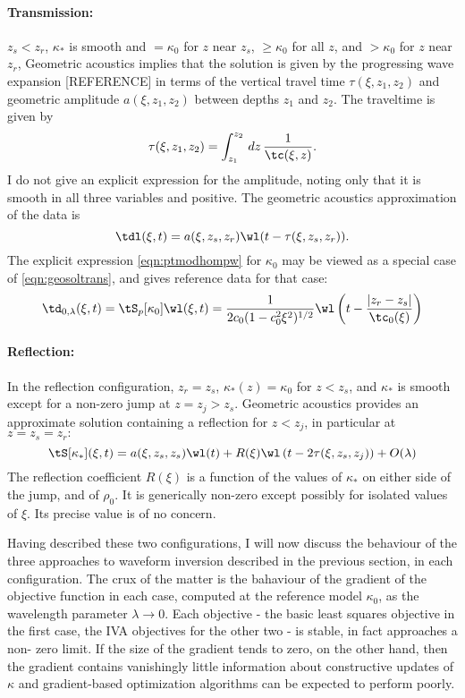 \paragraph{Transmission:} $z_s < z_r$, $\kappa_*$ is smooth and $ = \kappa_0$ for
$z$ near $z_s$, $\ge \kappa_0$ for all $z$, and $>\kappa_0$ for $z$
near $z_r$, Geometric acoustics implies that the solution is given by
the progressing wave expansion [REFERENCE] in terms of the vertical
travel time $\tau(\xi,z_1,z_2)$ and geometric amplitude
$a(\xi,z_1,z_2)$ between depths $z_1$ and $z_2$. The traveltime is given by
\[
\tau(\xi,z_1,z_2) = \int_{z_1}^{z_2}\,dz\, \frac{1}{\tc(\xi,z)}.
\]
I do not give an explicit expression for the amplitude, noting only
that it is smooth in all three variables and positive. The geometric
acoustics approximation of the data is
\begin{equation}
  \label{eqn:geosoltrans}
  \tdl(\xi,t) = a(\xi,z_s,z_r)\wl(t-\tau(\xi,z_s,z_r)).
\end{equation}
The explicit expression \ref{eqn:ptmodhompw} for $\kappa_0$ may be
viewed as a special case of \ref{eqn:geosoltrans}, and gives reference
data for that case:
\begin{equation}
  \label{eqn:analsoltrans}
  \td_{0,\lambda}(\xi,t) =  \tS_p[\kappa_0]\wl(\xi,t)  = \frac{1}{2c_0(1-c_0^2\xi^2)^{1/2}}\wl
                                \left(t-\frac{|z_r-z_s|}{\tc_0(\xi)}\right)
\end{equation}

\paragraph{Reflection:}
In the reflection configuration, $z_r=z_s$, $\kappa_*(z)=\kappa_0$ for
$z<z_s$, and $\kappa_*$ is smooth except for a non-zero jump at $z=z_j
> z_s$. Geometric acoustics provides an approximate solution
containing a reflection for $z<z_j$, in particular at $z=z_s=z_r:$
\[
\tS[\kappa_*](\xi,t) = a(\xi,z_s,z_s)\wl(t) +
R(\xi)\wl\left(t-2\tau(\xi,z_s,z_j)\right) + O(\lambda)
\]
The reflection coefficient $R(\xi)$ is a function of the values of
$\kappa_*$ on either side of the jump, and of $\rho_0$. It is
generically non-zero except possibly for isolated values of $\xi$. Its precise
value is of no concern.

Having described these two configurations, I will now discuss the
behaviour of the three approaches to waveform inversion described in
the previous section, in each configuration. The crux of the matter is
the bahaviour of the gradient of the objective function in each case,
computed at the reference model $\kappa_0$,
as the wavelength parameter $\lambda \rightarrow 0$. Each objective -
the basic least squares objective in the first case, the IVA
objectives for the other two - is stable, in fact approaches a non-
zero limit. If the size of the gradient tends to zero, on the other
hand, then the gradient contains vanishingly little information about
constructive updates of $\kappa$ and gradient-based optimization
algorithms can be expected to perform poorly.

